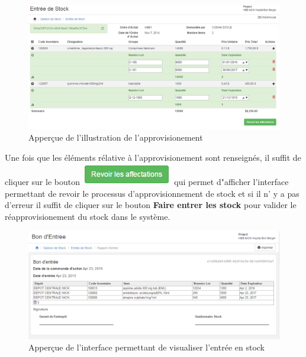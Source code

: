 \documentclass[12pt,a4paper]{report}
\begin{document}
\begin{figure}[h]
\begin{center}
\includegraphics[width=12cm]{pic/AppStockOK.png}
\end{center}
\caption{Apperçue de l'illustration de l'approvisionement}
\label{Apperçue de l'illustration de l'approvisionement}
\end{figure}
\newpage

Une fois que les éléments rélative à l'approvisionement sont renseignés, il suffit de cliquer sur le bouton \includegraphics[scale=0.7]{pic/RevAffectation.png} qui permet d"afficher l'interface permettant de revoir le processus d'approvisionnement de stock et si il n' y a pas d'erreur il suffit de cliquer sur le bouton \textbf{Faire entrer les stock} pour valider le réapprovisionement du stock dans le système.

\begin{figure}[h]
\begin{center}
\includegraphics[width=12cm]{pic/EntreStockEnter.png}
\end{center}
\caption{Apperçue de l'interface permettant de visualiser l'entrée en stock}
\label{Apperçue de l'interface permettant de visualiser l'entrée en stock}
\end{figure}
\end{document}
